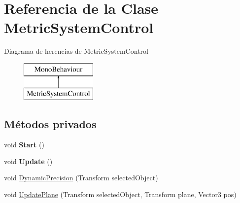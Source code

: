 \hypertarget{class_metric_system_control}{}\section{Referencia de la Clase Metric\+System\+Control}
\label{class_metric_system_control}
Diagrama de herencias de Metric\+System\+Control\begin{figure}[H]
\begin{center}
\leavevmode
\includegraphics[height=2.000000cm]{class_metric_system_control}
\end{center}
\end{figure}
\subsection*{Métodos privados}
\begin{DoxyCompactItemize}
\item 
\mbox{\label{class_metric_system_control_a4a80bda60b22963614748a45ada7067e}} 
void {\bfseries Start} ()
\item 
\mbox{\label{class_metric_system_control_a2316b4c6c9a620507878dfe0b601c9f0}} 
void {\bfseries Update} ()
\item 
void \mbox{\hyperlink{class_metric_system_control_a853f57f47211b8c3a1f48c53ba552a0e}{Dynamic\+Precision}} (Transform selected\+Object)
\item 
void \mbox{\hyperlink{class_metric_system_control_a233ff34bc7bf5ae589ffe0146430f2e0}{Update\+Plane}} (Transform selected\+Object, Transform plane, Vector3 pos)
\end{DoxyCompactItemize}
